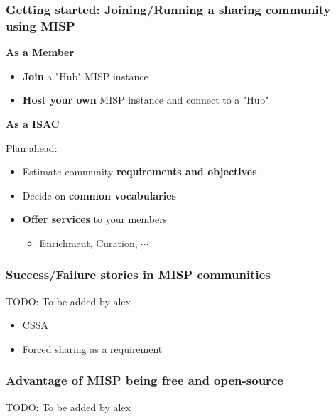 \begin{frame}
    \frametitle{Getting started: Joining/Running a sharing community using MISP}

    \begin{minipage}[t]{0.5\textwidth}
        \begin{center}
            \bf \Large As a Member
        \end{center}
        \begin{itemize}
            \item \textbf{Join} a "Hub" MISP instance
            \item \textbf{Host your own} MISP instance and connect to a "Hub"
        \end{itemize}
    \end{minipage}%
    \begin{minipage}[t]{0.5\textwidth}
        \begin{center}
            \bf \Large As a ISAC
        \end{center}
        Plan ahead:
        \begin{itemize}
            \item Estimate community \textbf{requirements and objectives}
            \item Decide on \textbf{common vocabularies}
            \item \textbf{Offer services} to your members
            \begin{itemize}
                \item Enrichment, Curation, $\cdots$
            \end{itemize}
        \end{itemize}
    \end{minipage}%
\end{frame}

\begin{frame}
    \frametitle{Success/Failure stories in MISP communities}
    TODO: To be added by alex
    \begin{itemize}
        \item CSSA
        \item Forced sharing as a requirement
    \end{itemize}
\end{frame}

\begin{frame}
    \frametitle{Advantage of MISP being free and open-source}
    TODO: To be added by alex
\end{frame}

